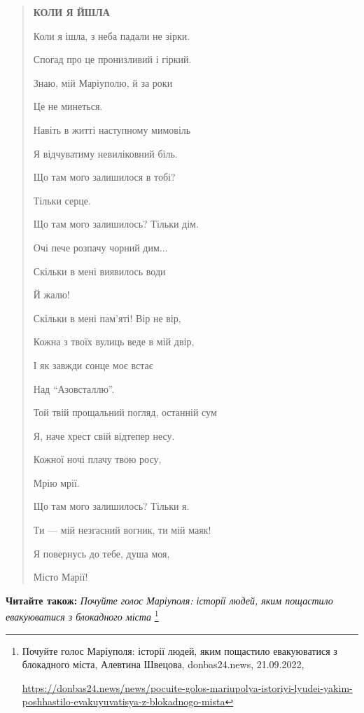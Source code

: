 \begin{quote}
\textbf{КОЛИ Я ЙШЛА}

Коли я ішла, з неба падали не зірки.

Спогад про це пронизливий і гіркий.

Знаю, мій Маріуполю, й за роки

Це не минеться.

Навіть в житті наступному мимовіль

Я відчуватиму невиліковний біль.

Що там мого залишилося в тобі?

Тільки серце.

Що там мого залишилось? Тільки дім.

Очі пече розпачу чорний дим...

Скільки в мені виявилось води

Й жалю!

Скільки в мені пам'яті! Вір не вір,

Кожна з твоїх вулиць веде в мій двір,

І як завжди сонце моє встає

Над \enquote{Азовсталлю}.

Той твій прощальний погляд, останній сум

Я, наче хрест свій відтепер несу.

Кожної ночі плачу твою росу,

Мрію мрії.

Що там мого залишилось? Тільки я.

Ти — мій незгасний вогник, ти мій маяк!

Я повернусь до тебе, душа моя,

Місто Марії!
\end{quote}

\textbf{Читайте також:} \emph{Почуйте голос Маріуполя: історії людей, яким пощастило евакуюватися з блокадного міста}%
\footnote{Почуйте голос Маріуполя: історії людей, яким пощастило евакуюватися з блокадного міста, Алевтина Швецова, donbas24.news, 21.09.2022, \par%
\url{https://donbas24.news/news/pocuite-golos-mariupolya-istoriyi-lyudei-yakim-poshhastilo-evakuyuvatisya-z-blokadnogo-mista}%
}


